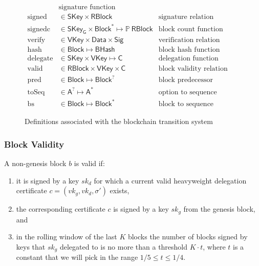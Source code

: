 \documentclass[11pt,a4paper]{article}
\newcommand{\powerset}[1]{\mathbb{P}~#1}
\newcommand{\var}[1]{\mathit{#1}}
\newcommand{\type}[1]{\mathsf{#1}}
\newcommand{\seqof}[1]{#1^{*}}
\newcommand{\BHash}{\type{BHash}}  %
\newcommand{\RBlock}{\type{RBlock}}
\newcommand{\Block}{\type{Block}}
\newcommand{\HCert}{\type{C}}
\newcommand{\SKey}{\type{SKey}}
\newcommand{\SKeyGen}{\type{SKey_G}}
\newcommand{\VKey}{\type{VKey}}
\newcommand{\Sig}{\type{Sig}}
\newcommand{\Data}{\type{Data}}
\newcommand{\hashname}{hash}
\newcommand{\signedname}{signed}
\newcommand{\signedseqname}{signedc}
\newcommand{\verifyname}{verify}
\newcommand{\delegatename}{delegate}
\newcommand{\validname}{valid}
\newcommand{\predbname}{pred} %
\newcommand{\toseqname}{toSeq} %
\newcommand{\predbseqname}{bs} %
\begin{document}
\begin{figure}[h]
\begin{align*}
      & \text{signature function}\\
    \text{\signedname} & \in \SKey \times \RBlock & \text{signature relation}\\
    \text{\signedseqname} & \in \SKeyGen \times \seqof{\Block} \mapsto \powerset{\RBlock}
      & \text{block count function}\\
    \text{\verifyname} & \in \VKey \times \Data \times \Sig
      & \text{verification relation}\\
    \text{\hashname} & \in \Block \mapsto \BHash
      & \text{block hash function}\\
    \text{\delegatename} & \in \SKey \times \VKey \mapsto \HCert
      & \text{delegation function}\\
    \text{\validname} & \in \RBlock \times \VKey \times \HCert
      & \text{block validity relation}\\
    \text{\predbname} & \in \Block \mapsto \Block^?
      & \text{block predecessor function} \\
    \text{\toseqname} & \in \type{A}^? \mapsto \seqof{\type{A}}
      & \text{option to sequence function} \\
    \text{\predbseqname} & \in \Block \mapsto \seqof{\Block}
      & \text{block to sequence function}
  \end{align*}
  \caption{Definitions associated with the blockchain transition system}
  \label{fig:state-trans-abstract}
\end{figure}

\subsubsection{Block Validity}
\label{sec:block-valid}

A non-genesis block $\var{b}$ is valid if:
%
\begin{enumerate}
\item it is signed by a key $\var{sk_d}$ for which a current valid heavyweight delegation
  certificate $c = (vk_g, vk_d, \sigma')$ exists,
\item the corresponding certificate $c$ is signed by a key $sk_g$ from the
  genesis block, and
\item in the rolling window of the last $K$ blocks the number of blocks signed
  by keys that $sk_g$ delegated to is no more than a threshold $K \cdot t$,
  where $t$ is a constant that we will pick in the range
  $1/5 \leq t \leq 1/4$.
\end{enumerate}
\end{document}
